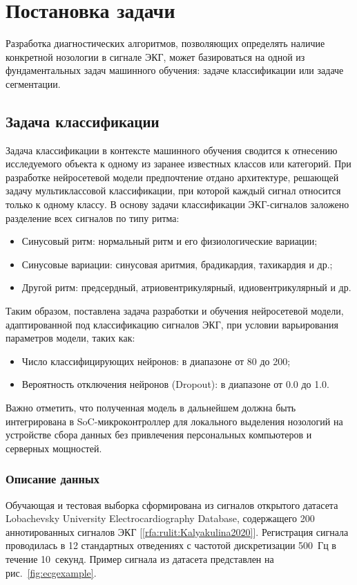 \documentclass[10pt,a4paper]{book}
\begin{document}
\section{Постановка задачи}
\label{sec-problem}

Разработка диагностических алгоритмов, позволяющих определять наличие конкретной нозологии в сигнале ЭКГ, может базироваться на одной из фундаментальных задач машинного обучения: задаче классификации или задаче сегментации.

\subsection{Задача классификации}
Задача классификации в контексте машинного обучения сводится к отнесению исследуемого объекта к одному из заранее известных классов или категорий. При разработке нейросетевой модели предпочтение отдано архитектуре, решающей задачу мультиклассовой классификации, при которой каждый сигнал относится только к одному классу. В основу задачи классификации ЭКГ-сигналов заложено разделение всех сигналов по типу ритма:
\begin{itemize}
  \item Синусовый ритм: нормальный ритм и его физиологические вариации;
  \item Синусовые вариации: синусовая аритмия, брадикардия, тахикардия и др.;
  \item Другой ритм: предсердный, атриовентрикулярный, идиовентрикулярный и др.
\end{itemize}

Таким образом, поставлена задача разработки и обучения нейросетевой модели, адаптированной под классификацию сигналов ЭКГ, при условии варьирования параметров модели, таких как:
\begin{itemize}
  \item Число классифицирующих нейронов: в диапазоне от 80 до 200;
  \item Вероятность отключения нейронов (Dropout): в диапазоне от 0.0 до 1.0.
\end{itemize}
Важно отметить, что полученная модель в дальнейшем должна быть интегрирована в SoC-микроконтроллер для локального выделения нозологий на устройстве сбора данных без привлечения персональных компьютеров и серверных мощностей.

\subsubsection{Описание данных}
Обучающая и тестовая выборка сформирована из сигналов открытого датасета Lobachevsky University Electrocardiography Database, содержащего 200 аннотированных сигналов ЭКГ [\ref{rfa:rulit:Kalyakulina2020}]. Регистрация сигнала проводилась в 12 стандартных отведениях с частотой дискретизации 500~Гц в течение 10~секунд. Пример сигнала из датасета представлен на рис.~\ref{fig:ecgexample}.
\end{document}
